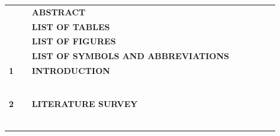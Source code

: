 \documentclass[12pt,letterpaper,oneside]{report}
\begin{document}
{
\begin{longtable}{@{}p{0.08\linewidth}p{0.76\linewidth}>{\raggedleft\arraybackslash}p{0.1\linewidth}@{}}
\textbf{} & \textbf{ABSTRACT} & \textbf{\pageref{abs}} \\
\textbf{} & \textbf{LIST OF TABLES} & \textbf{\pageref{lot}} \\
\textbf{} & \textbf{LIST OF FIGURES} & \textbf{\pageref{lof}} \\
\textbf{} & \textbf{LIST OF SYMBOLS AND ABBREVIATIONS} & \textbf{\pageref{abbr}} \\
\textbf{1} & \textbf{INTRODUCTION} & \textbf{\pageref{ch:1}} \\
 & \hspace{1.2em}{\small Overview} & {\small\pageref{sec:1.1}} \\
 & \hspace{1.2em}{\small Motivation} & {\small\pageref{sec:1.2}} \\
 & \hspace{1.2em}{\small Problem Statement} & {\small\pageref{sec:1.3}} \\
 & \hspace{1.2em}{\small Objectives of the Study} & {\small\pageref{sec:1.4}} \\
 & \hspace{1.2em}{\small Scope of the Study} & {\small\pageref{sec:1.5}} \\
 & \hspace{1.2em}{\small Significance of the Study} & {\small\pageref{sec:1.6}} \\
\textbf{2} & \textbf{LITERATURE SURVEY} & \textbf{\pageref{ch:2}} \\
 & \hspace{1.2em}{\small IoT in Healthcare} & {\small\pageref{sec:2.1}} \\
 & \hspace{1.2em}{\small Photoplethysmography and Wearable Pulse Sensing} & {\small\pageref{sec:2.2}} \\
 & \hspace{1.2em}{\small Stress and Heart Rate Variability} & {\small\pageref{sec:2.3}} \\
 & \hspace{1.2em}{\small Motion Artefacts and Signal Quality} & {\small\pageref{sec:2.4}} \\
 & \hspace{1.2em}{\small Haptic Cues and Biofeedback} & {\small\pageref{sec:2.5}} \\
 & \hspace{1.2em}{\small Facial Exercise Therapy and MirrorWell} & {\small\pageref{sec:2.6}} \\

\end{longtable}}
\end{document}
